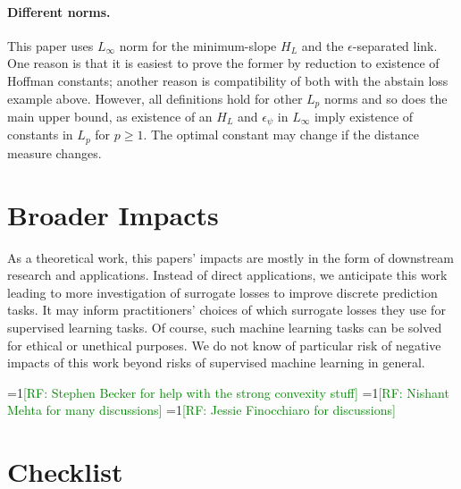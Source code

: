 \documentclass{article}
\theoremstyle{definition}\newtheorem{definition}{Definition}
\theoremstyle{definition}\newtheorem{assumption}{Assumption}
\newcommand{\Comments}{0}
\newcommand{\mynote}[2]{\ifnum\Comments=1\textcolor{#1}{#2}\fi}
\newcommand{\raf}[1]{\mynote{green}{[RF: #1]}}
\begin{document}
\paragraph{Different norms.}
This paper uses $L_{\infty}$ norm for the minimum-slope $H_L$ and the $\epsilon$-separated link.
One reason is that it is easiest to prove the former by reduction to existence of Hoffman constants; another reason is compatibility of both with the abstain loss example above.
However, all definitions hold for other $L_p$ norms and so does the main upper bound, as existence of an $H_L$ and $\epsilon_{\psi}$ in $L_{\infty}$ imply existence of constants in $L_p$ for $p \geq 1$.
The optimal constant may change if the distance measure changes.


\section{Broader Impacts}
As a theoretical work, this papers' impacts are mostly in the form of downstream research and applications.
Instead of direct applications, we anticipate this work leading to more investigation of surrogate losses to improve discrete prediction tasks.
It may inform practitioners' choices of which surrogate losses they use for supervised learning tasks.
Of course, such machine learning tasks can be solved for ethical or unethical purposes.
We do not know of particular risk of negative impacts of this work beyond risks of supervised machine learning in general.




\begin{ack}
  \raf{Stephen Becker for help with the strong convexity stuff}
  \raf{Nishant Mehta for many discussions}
  \raf{Jessie Finocchiaro for discussions}
\end{ack}





\section*{Checklist}
\end{document}
